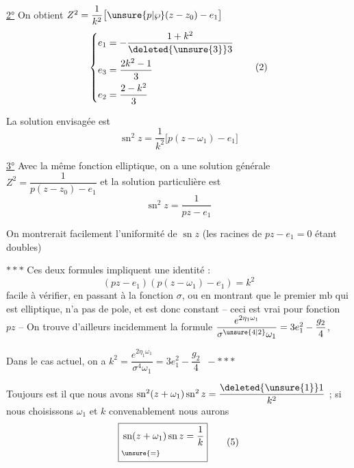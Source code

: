 \begingroup\makeatletter\tagsleft@true\makeatother
\uline{2°} On obtient $Z^2=\dfrac{1}{k^2}\bigl[\unsure{p|\wp}(z-z_0)-e_1\bigr]$
\[
\left\{\begin{aligned}
e_1&=-\frac{1+k^2}{\deleted{\unsure{3}}3}\\
e_3&=\frac{2k^2-1}{3}\\
e_2&=\frac{2-k^2}{3}
\end{aligned}\right. \tag*{(2)}
\]

La solution envisagée est
\[
\boxed{\operatorname{sn}^2 z=\frac{1}{k^2}\bigl[p(z-\omega_1)-e_1\bigr]} \tag*{(3)}
\]

\uline{3°} Avec la même fonction elliptique, on a une solution générale $Z^2=\dfrac{1}{p(z-z_0)-e_1}$ et la solution particulière est
\[
\boxed{\operatorname{sn}^2 z=\frac{1}{pz-e_1}} \tag*{(4)}
\]

On montrerait facilement l'uniformité de  $\operatorname{sn}z$ (les racines de $pz-e_1=0$ étant doubles)

$\ast\ast\ast$ Ces deux formules impliquent une identité :
\[
(pz-e_1)(p(z-\omega_1)-e_1)=k^2
\]
facile à vérifier, en passant à la fonction $\sigma$, ou en montrant que le premier mb qui est elliptique, n'a pas de pole, et est donc constant -- ceci est vrai pour  fonction $pz$ -- On trouve d'ailleurs incidemment la formule $\dfrac{e^{2\eta_1\omega_1}}{\sigma^{\unsure{4|2}}\omega_1}=3e_1^2-\dfrac{g_2}{4}$, 

Dans le cas actuel, on a $k^2=\dfrac{e^{2\eta_1\omega_1}}{\sigma^4\omega_1}=3e_1^2-\dfrac{g_2}{4}$ $\,-\ast\ast\ast$

Toujours est il que nous avons $\operatorname{sn}^2(z+\omega_1)\operatorname{sn}^2z=\dfrac{\deleted{\unsure{1}}1}{k^2}$ ; si nous choisissons $\omega_1$ et $k$ convenablement nous aurons
\[
\boxed{\begin{aligned}
&\operatorname{sn}(z+\omega_1)\operatorname{sn}z=\frac{1}{k}\\[-.5ex]
&\scriptstyle\unsure{=}
\end{aligned}} \tag*{(5)}
\]
\endgroup
